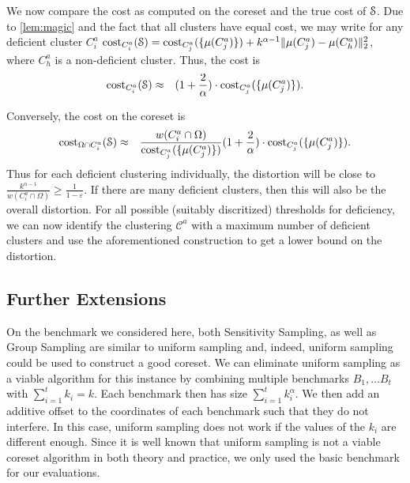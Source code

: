 We now compare the cost as computed on the coreset and the true cost of $\mathcal{S}$. Due to \cref{lem:magic} and the fact that all clusters have equal cost, we may write for any deficient cluster $C_i^a$
$\text{cost}_{C_i^a}(\mathcal{S}) = \text{cost}_{C_j^a}(\{\mu(C_j^a)\}) + k^{\alpha-1}\|\mu(C_j^a)-\mu(C_h^a)\|_2^2$, where $C_h^a$ is a non-deficient cluster.
Thus, the cost is 
\begin{eqnarray*}
\text{cost}_{C_i^a}(\mathcal{S}) &\approx & (1+\frac{2}{\alpha})\cdot \text{cost}_{C_j^a}(\{\mu(C_j^a)\}).
\end{eqnarray*}

Conversely, the cost on the coreset is
\begin{eqnarray*}
\text{cost}_{\Omega\cap C_i^a}(\mathcal{S})  
& \approx & \frac{w(C_i^a \cap \Omega)}{ \text{cost}_{C_j^a}(\{\mu(C_j^a)\})}(1+\frac{2}{\alpha})\cdot \text{cost}_{C_j^a}(\{\mu(C_j^a)\}).
\end{eqnarray*}
Thus for each deficient clustering individually, the distortion will be close to $\frac{k^{\alpha-1}}{w(C_i^a \cap \Omega)} \geq \frac{1}{1-\varepsilon}$.
If there are many deficient clusters, then this will also be the overall distortion.
For all possible (suitably discritized) thresholds for deficiency, we can now identify the clustering $\mathcal{C}^a$ with a maximum number of deficient clusters and use the aforementioned construction to get a lower bound on the distortion.


\subsection{Further Extensions}

On the benchmark we considered here, both Sensitivity Sampling, as well as Group Sampling are similar to uniform sampling and, indeed, uniform sampling could be used to construct a good coreset. We can eliminate uniform sampling as a viable algorithm for this instance by combining multiple benchmarks $B_1,\ldots B_t$ with $\sum_{i=1}^t  k_i =k$. Each benchmark then has size $\sum_{i=1}^t  k_i^{\alpha}$. We then add an additive offset to the coordinates of each benchmark such that they do not interfere. In this case, uniform sampling does not work if the values of the $k_i$ are different enough. Since it is well known that uniform sampling is not a viable coreset algorithm in both theory and practice, we only used the basic benchmark for our evaluations.



